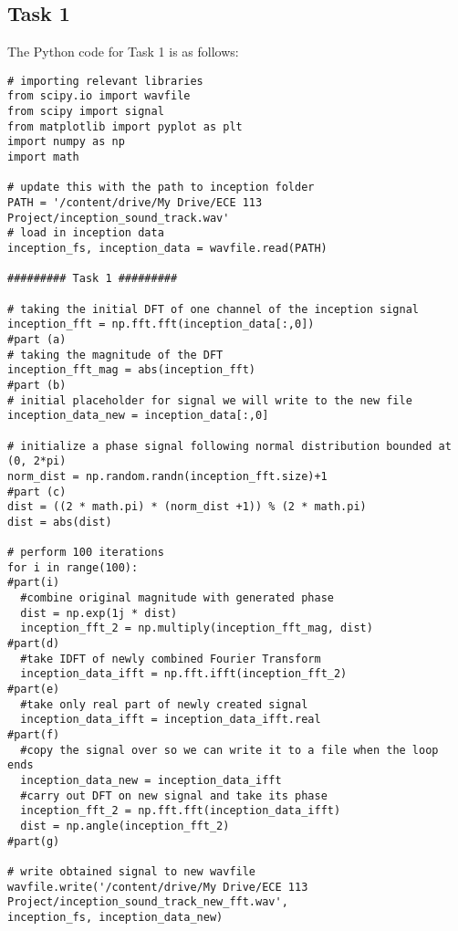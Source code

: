 \documentclass[letterpaper,twocolumn,10pt]{article}
\begin{document}
\subsection*{Task 1}
The Python code for Task 1 is as follows:
\begin{verbatim}
# importing relevant libraries
from scipy.io import wavfile
from scipy import signal
from matplotlib import pyplot as plt
import numpy as np
import math

# update this with the path to inception folder
PATH = '/content/drive/My Drive/ECE 113 Project/inception_sound_track.wav'
# load in inception data
inception_fs, inception_data = wavfile.read(PATH)

######### Task 1 #########

# taking the initial DFT of one channel of the inception signal
inception_fft = np.fft.fft(inception_data[:,0])                     #part (a)
# taking the magnitude of the DFT
inception_fft_mag = abs(inception_fft)                              #part (b)
# initial placeholder for signal we will write to the new file
inception_data_new = inception_data[:,0]                              

# initialize a phase signal following normal distribution bounded at (0, 2*pi)
norm_dist = np.random.randn(inception_fft.size)+1                   #part (c)
dist = ((2 * math.pi) * (norm_dist +1)) % (2 * math.pi)     
dist = abs(dist)

# perform 100 iterations
for i in range(100):                                                #part(i)
  #combine original magnitude with generated phase
  dist = np.exp(1j * dist)
  inception_fft_2 = np.multiply(inception_fft_mag, dist)            #part(d)
  #take IDFT of newly combined Fourier Transform
  inception_data_ifft = np.fft.ifft(inception_fft_2)                #part(e)
  #take only real part of newly created signal
  inception_data_ifft = inception_data_ifft.real                    #part(f)
  #copy the signal over so we can write it to a file when the loop ends
  inception_data_new = inception_data_ifft
  #carry out DFT on new signal and take its phase
  inception_fft_2 = np.fft.fft(inception_data_ifft)
  dist = np.angle(inception_fft_2)                                  #part(g)                                

# write obtained signal to new wavfile
wavfile.write('/content/drive/My Drive/ECE 113 Project/inception_sound_track_new_fft.wav', 
inception_fs, inception_data_new)




\end{verbatim}
\end{document}
